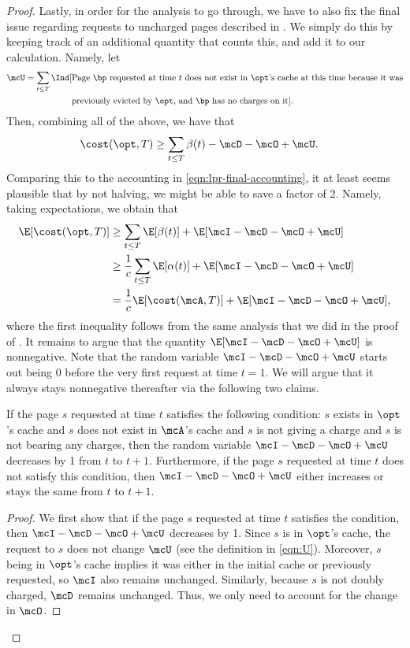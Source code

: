 \begin{proof}
    Lastly, in order for the analysis to go through, we have to also fix the final issue regarding requests to uncharged pages described in . We simply do this by keeping track of an additional quantity that counts this, and add it to our calculation. Namely, let
    \begin{align}
        \mcU = \sum_{t \le T}\Ind[&\text{Page $\bp$ requested at time $t$ does not exist in $\opt$'s cache at this time because it was} \nonumber \\ 
        &\text{previously evicted by $\opt$, and $\bp$ has no charges on it}]. \label{eqn:U}
    \end{align}
    Then, combining all of the above, we have that
    \begin{align}
        \cost(\opt, T) &\ge \sum_{t \le T}\beta(t) - \mcD - \mcO + \mcU. \label{eqn:updated-final-accounting}
    \end{align}
    Comparing this to the accounting in \eqref{eqn:lpr-final-accounting}, it at least seems plausible that by not halving, we might be able to save a factor of 2. Namely, taking expectations, we obtain that
    \begin{align*}
        \E[\cost(\opt, T)] &\ge \sum_{t \le T} \E[\beta(t)] + \E[\mcI - \mcD - \mcO + \mcU] \\
        &\ge \frac{1}{c}\sum_{t \le T}\E[\alpha(t)] + \E[\mcI - \mcD - \mcO + \mcU] \\
        &= \frac{1}{c}\E[\cost(\mcA, T)] + \E[\mcI - \mcD - \mcO + \mcU],
    \end{align*}
    where the first inequality follows from the same analysis that we did in the proof of . It remains to argue that the quantity $\E[\mcI - \mcD - \mcO + \mcU]$ is nonnegative. Note that the random variable $\mcI - \mcD - \mcO + \mcU$ starts out being $0$ before the very first request at time $t=1$. We will argue that it always stays nonnegative thereafter via the following two claims.

    \begin{claim}
        \label{claim:potential-decrease-characterization}
         If the page $s$ requested at time $t$ satisfies the following condition: $s$ exists in $\opt$'s cache and $s$ does not exist in $\mcA$'s cache and $s$ is not giving a charge and $s$ is not bearing any charges, then the random variable $\mcI-\mcD-\mcO+\mcU$ decreases by 1 from $t$ to $t+1$. Furthermore, if the page $s$ requested at time $t$ does not satisfy this condition, then $\mcI-\mcD-\mcO+\mcU$ either increases or stays the same from $t$ to $t+1$.
    \end{claim}
    \begin{proof}
        We first show that if the page $s$ requested at time $t$ satisfies the condition, then $\mcI - \mcD - \mcO + \mcU$ decreases by 1. Since $s$ is in $\opt$'s cache, the request to $s$ does not change $\mcU$ (see the definition in \eqref{eqn:U}). Moreover, $s$ being in $\opt$'s cache implies it was either in the initial cache or previously requested, so $\mcI$ also remains unchanged. Similarly, because $s$ is not doubly charged, $\mcD$ remains unchanged. Thus, we only need to account for the change in $\mcO$.


\end{proof}
\end{proof}
